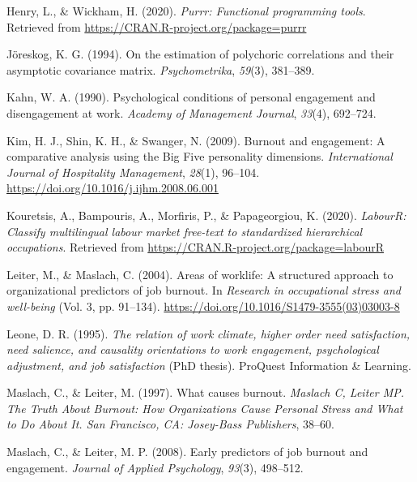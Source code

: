 \documentclass[
  english,
  man]{apa6}
\begin{document}
\leavevmode\hypertarget{ref-R-purrr}{}%
Henry, L., \& Wickham, H. (2020). \emph{Purrr: Functional programming tools}. Retrieved from \url{https://CRAN.R-project.org/package=purrr}

\leavevmode\hypertarget{ref-joreskog1994estimation}{}%
Jöreskog, K. G. (1994). On the estimation of polychoric correlations and their asymptotic covariance matrix. \emph{Psychometrika}, \emph{59}(3), 381--389.

\leavevmode\hypertarget{ref-kahn_psychological_1990}{}%
Kahn, W. A. (1990). Psychological conditions of personal engagement and disengagement at work. \emph{Academy of Management Journal}, \emph{33}(4), 692--724.

\leavevmode\hypertarget{ref-kim_burnout_2009}{}%
Kim, H. J., Shin, K. H., \& Swanger, N. (2009). Burnout and engagement: A comparative analysis using the Big Five personality dimensions. \emph{International Journal of Hospitality Management}, \emph{28}(1), 96--104. \url{https://doi.org/10.1016/j.ijhm.2008.06.001}

\leavevmode\hypertarget{ref-R-labourR}{}%
Kouretsis, A., Bampouris, A., Morfiris, P., \& Papageorgiou, K. (2020). \emph{LabourR: Classify multilingual labour market free-text to standardized hierarchical occupations}. Retrieved from \url{https://CRAN.R-project.org/package=labourR}

\leavevmode\hypertarget{ref-leiter_areas_2004}{}%
Leiter, M., \& Maslach, C. (2004). Areas of worklife: A structured approach to organizational predictors of job burnout. In \emph{Research in occupational stress and well-being} (Vol. 3, pp. 91--134). \url{https://doi.org/10.1016/S1479-3555(03)03003-8}

\leavevmode\hypertarget{ref-leone_relation_1995}{}%
Leone, D. R. (1995). \emph{The relation of work climate, higher order need satisfaction, need salience, and causality orientations to work engagement, psychological adjustment, and job satisfaction} (PhD thesis). ProQuest Information \& Learning.

\leavevmode\hypertarget{ref-maslach1997causes}{}%
Maslach, C., \& Leiter, M. (1997). What causes burnout. \emph{Maslach C, Leiter MP. The Truth About Burnout: How Organizations Cause Personal Stress and What to Do About It. San Francisco, CA: Josey-Bass Publishers}, 38--60.

\leavevmode\hypertarget{ref-maslach_early_2008}{}%
Maslach, C., \& Leiter, M. P. (2008). Early predictors of job burnout and engagement. \emph{Journal of Applied Psychology}, \emph{93}(3), 498--512.
\end{document}
